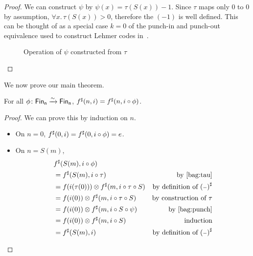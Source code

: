 \begin{proof}
We can construct $\psi$ by $\psi(x) = \tau(S(x)) - 1$.
Since $\tau$ maps only 0 to 0 by assumption, $\forall x. \, \tau(S(x)) > 0$, therefore
the $(- 1)$ is well defined. This can be thought of as a special case $k = 0$ of the punch-in and punch-out
equivalence used to construct Lehmer codes in~\cite{choudhurySymmetriesReversibleProgramming2022}.

\begin{figure}[H]
    \centering
    \hspace{1em}
    \caption{Operation of $\psi$ constructed from $\tau$}
    \label{fig:enter-label}
\end{figure}
\end{proof}


We now prove our main theorem.

\begin{theorem}
For all $\phi\colon \Fin[n]\xto{\sim}\Fin[n]$, $\ext{f}(n, i) \id \ext{f}(n, i \circ \phi)$.
\end{theorem}

\begin{proof}
We can prove this by induction on $n$.
\begin{itemize}
    \item On $n = 0$, $\ext{f}(0, i) \id \ext{f}(0, i \circ \phi) = e$.
    \item On $n = S(m)$,
        \begin{align*}
        & {f}^{\sharp}(S(m), i \circ \phi) \\
        & = {f}^{\sharp}(S(m), i \circ \tau) & \text{by~\ref{bag:tau}} \\
        & = f(i(\tau(0))) \otimes {f}^{\sharp}(m, i \circ \tau \circ S) & \text{by definition of ${({\scriptstyle{-}})}^{\sharp}$} \\
        & = f(i(0)) \otimes {f}^{\sharp}(m, i \circ \tau \circ S) & \text{by construction of $\tau$} \\
        & = f(i(0)) \otimes {f}^{\sharp}(m, i \circ S \circ \psi) &\text{by~\ref{bag:punch}} \\
        & = f(i(0)) \otimes {f}^{\sharp}(m, i \circ S) & \text{induction} \\
        & = {f}^{\sharp}(S(m), i) & \text{by definition of ${({\scriptstyle{-}})}^{\sharp}$}
        \end{align*}
\end{itemize}
\end{proof}

